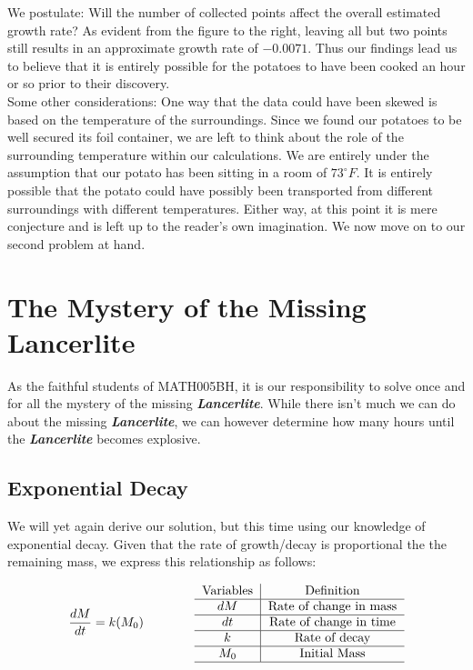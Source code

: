 \documentclass{article}
\begin{document}
We postulate: Will the number of collected points affect the overall estimated growth rate? As evident from the figure to the right, leaving all but two points still results in an approximate growth rate of $-0.0071$. Thus our findings lead us to believe that it is entirely possible for the potatoes to have been cooked an hour or so prior to their discovery. \\

Some other considerations: One way that the data could have been skewed is based on the
temperature of the surroundings. Since we found our potatoes to be well secured its foil
container, we are left to think about the role of the surrounding temperature within our
calculations. We are entirely under the assumption that our potato has been sitting in a room
of $73^{\circ}F$. It is entirely possible that the potato could have possibly been transported
 from different surroundings with different temperatures. Either
way, at this point it is mere conjecture and is left up to the reader's own imagination. We now
move on to our second problem at hand.

\newpage
\section{The Mystery of the Missing Lancerlite}
As the faithful students of MATH005BH, it is our responsibility to solve once and for all the mystery of the missing \textbf{\textit{Lancerlite}}. While there isn't much we can do about the missing \textbf{\textit{Lancerlite}}, we can however determine how many hours until the \textbf{\textit{Lancerlite}} becomes explosive. 

\subsection{Exponential Decay}
We will yet again derive our solution, but this time using our knowledge of exponential decay. Given that the rate of growth/decay is proportional the the remaining mass, we express this relationship as follows:


\begin{align*}
    \frac{dM}{dt}=k(M_0) \qquad\qquad
    \begin{tabular}{c|c}
     Variables & Definition  \\ \hline
     $dM$ & \text{Rate of change in mass} \\\hline 
     $dt$ & \text{Rate of change in time} \\\hline
     $k$ & \text{Rate of decay} \\\hline
     $M_0$ & \text{Initial Mass}\\\hline
\end{tabular}
\end{align*}
\end{document}
